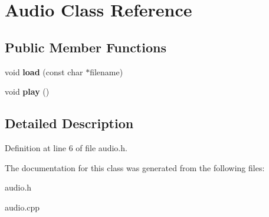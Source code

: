 \hypertarget{classAudio}{}\section{Audio Class Reference}
\label{classAudio}
\subsection*{Public Member Functions}
\begin{DoxyCompactItemize}
\item 
void {\bfseries load} (const char $\ast$filename)\hypertarget{classAudio_a27b173bbcb7e2b7dc9f5a8a87d02f570}{}\label{classAudio_a27b173bbcb7e2b7dc9f5a8a87d02f570}

\item 
void {\bfseries play} ()\hypertarget{classAudio_a2916f9015031bee9abb98adf0d83e7ee}{}\label{classAudio_a2916f9015031bee9abb98adf0d83e7ee}

\end{DoxyCompactItemize}


\subsection{Detailed Description}


Definition at line 6 of file audio.\+h.



The documentation for this class was generated from the following files\+:\begin{DoxyCompactItemize}
\item 
audio.\+h\item 
audio.\+cpp\end{DoxyCompactItemize}
